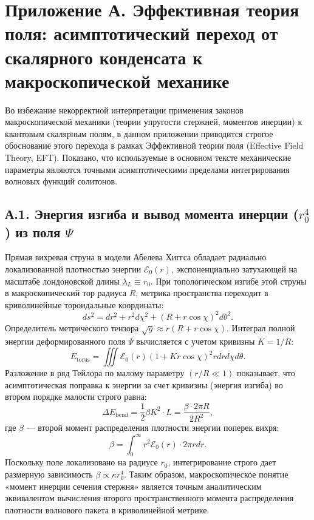 \documentclass[12pt,a4paper]{article}
\begin{document}
\section*{Приложение А. Эффективная теория поля: асимптотический переход от скалярного конденсата к макроскопической механике}

Во избежание некорректной интерпретации применения законов макроскопической механики (теории упругости стержней, моментов инерции) к квантовым скалярным полям, в данном приложении приводится строгое обоснование этого перехода в рамках Эффективной теории поля (Effective Field Theory, EFT). Показано, что используемые в основном тексте механические параметры являются точными асимптотическими пределами интегрирования волновых функций солитонов.

\subsection*{А.1. Энергия изгиба и вывод момента инерции ($r_0^4$) из поля $\Psi$}
Прямая вихревая струна в модели Абелева Хиггса обладает радиально локализованной плотностью энергии $\mathcal{E}_0(r)$, экспоненциально затухающей на масштабе лондоновской длины $\lambda_L \equiv r_0$. При топологическом изгибе этой струны в макроскопический тор радиуса $R$, метрика пространства переходит в криволинейные тороидальные координаты:
\begin{equation}
ds^2 = dr^2 + r^2 d\chi^2 + (R + r\cos\chi)^2 d\theta^2.
\end{equation}
Определитель метрического тензора $\sqrt{g} \approx r(R + r\cos\chi)$. Интеграл полной энергии деформированного поля $\Psi$ вычисляется с учетом кривизны $K = 1/R$:
\begin{equation}
E_{\text{torus}} = \iiint \mathcal{E}_0(r) \left(1 + K r\cos\chi\right)^2 r dr d\chi d\theta.
\end{equation}
Разложение в ряд Тейлора по малому параметру $(r/R \ll 1)$ показывает, что асимптотическая поправка к энергии за счет кривизны (энергия изгиба) во втором порядке малости строго равна:
\begin{equation}
\Delta E_{\text{bend}} = \frac{1}{2} \beta K^2 \cdot L = \frac{\beta \cdot 2\pi R}{2 R^2},
\end{equation}
где $\beta$ — второй момент распределения плотности энергии поперек вихря:
\begin{equation}
\beta = \int_0^\infty r^2 \mathcal{E}_0(r) \cdot 2\pi r dr.
\end{equation}
Поскольку поле локализовано на радиусе $r_0$, интегрирование строго дает размерную зависимость $\beta \propto \kappa r_0^4$. Таким образом, макроскопическое понятие «момент инерции сечения стержня» является точным аналитическим эквивалентом вычисления второго пространственного момента распределения плотности волнового пакета в криволинейной метрике.
\end{document}
